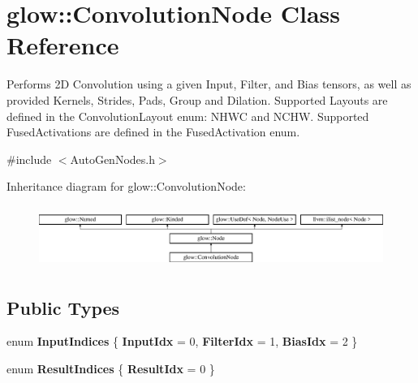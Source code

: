 \hypertarget{classglow_1_1_convolution_node}{}\section{glow\+:\+:Convolution\+Node Class Reference}
\label{classglow_1_1_convolution_node}


Performs 2D Convolution using a given Input, Filter, and Bias tensors, as well as provided Kernels, Strides, Pads, Group and Dilation. Supported Layouts are defined in the Convolution\+Layout enum\+: N\+H\+WC and N\+C\+HW. Supported Fused\+Activations are defined in the Fused\+Activation enum.  




{\ttfamily \#include $<$Auto\+Gen\+Nodes.\+h$>$}

Inheritance diagram for glow\+:\+:Convolution\+Node\+:\begin{figure}[H]
\begin{center}
\leavevmode
\includegraphics[height=2.028986cm]{classglow_1_1_convolution_node}
\end{center}
\end{figure}
\subsection*{Public Types}
\begin{DoxyCompactItemize}
\item 
\mbox{\label{classglow_1_1_convolution_node_a683eeed72b8930c6d6c9604ecdebe906}} 
enum {\bfseries Input\+Indices} \{ {\bfseries Input\+Idx} = 0, 
{\bfseries Filter\+Idx} = 1, 
{\bfseries Bias\+Idx} = 2
 \}
\item 
\mbox{\label{classglow_1_1_convolution_node_abbfb0fcff02d9284a7360332a7b4a6b1}} 
enum {\bfseries Result\+Indices} \{ {\bfseries Result\+Idx} = 0
 \}
\end{DoxyCompactItemize}
